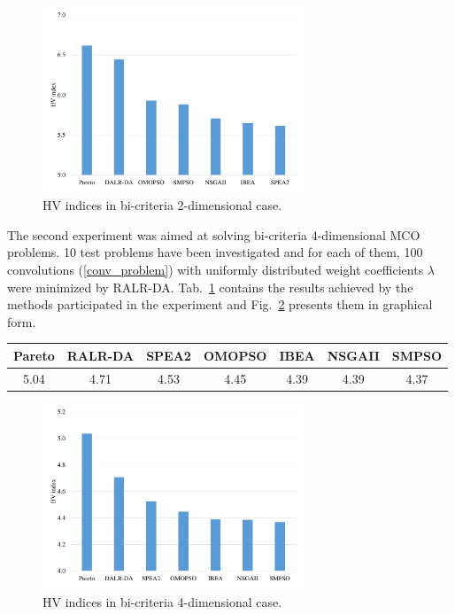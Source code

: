 \documentclass[]{interact}
\theoremstyle{plain}%
\theoremstyle{definition}
\theoremstyle{remark}
\begin{document}
\begin{figure}
\centering
\includegraphics[width=0.7\textwidth]{fig3.pdf} 
\caption{HV indices in bi-criteria 2-dimensional case.}\label{fig3} 
\end{figure}

The second experiment was aimed at solving bi-criteria 4-dimensional MCO problems. 10 test problems have been investigated and for each of them, 100 convolutions (\ref{conv_problem}) with uniformly distributed weight coefficients $\lambda$ were minimized by RALR-DA. 
Tab.~\ref{tab2} contains the results achieved by the methods participated in the experiment and Fig.~\ref{fig4} presents them in graphical form.

\begin{table}
{\begin{tabular}{ccccccc} \toprule
 Pareto & RALR-DA & SPEA2 & OMOPSO & IBEA & NSGAII & SMPSO   \\ \midrule
  5.04 & 4.71 & 4.53 & 4.45 & 4.39 & 4.39 & 4.37 \\ \bottomrule
\end{tabular}}
\label{tab2}
\end{table}

\begin{figure}
\centering
\includegraphics[width=0.7\textwidth]{fig4.pdf} 
\caption{HV indices in bi-criteria 4-dimensional case.}\label{fig4} 
\end{figure}
\end{document}
